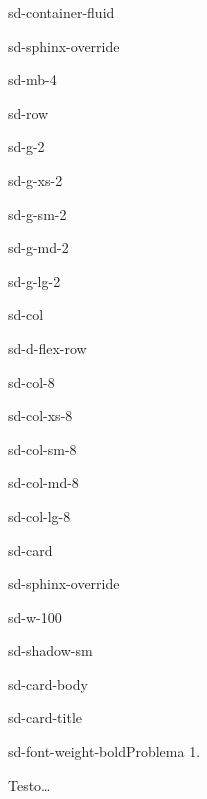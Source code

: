 \documentclass[letterpaper,10pt,italian]{jupyterBook}
\begin{document}
\begin{sphinxuseclass}{sd-container-fluid}
\begin{sphinxuseclass}{sd-sphinx-override}
\begin{sphinxuseclass}{sd-mb-4}
\begin{sphinxuseclass}{sd-row}
\begin{sphinxuseclass}{sd-g-2}
\begin{sphinxuseclass}{sd-g-xs-2}
\begin{sphinxuseclass}{sd-g-sm-2}
\begin{sphinxuseclass}{sd-g-md-2}
\begin{sphinxuseclass}{sd-g-lg-2}
\begin{sphinxuseclass}{sd-col}
\begin{sphinxuseclass}{sd-d-flex-row}
\begin{sphinxuseclass}{sd-col-8}
\begin{sphinxuseclass}{sd-col-xs-8}
\begin{sphinxuseclass}{sd-col-sm-8}
\begin{sphinxuseclass}{sd-col-md-8}
\begin{sphinxuseclass}{sd-col-lg-8}
\begin{sphinxuseclass}{sd-card}
\begin{sphinxuseclass}{sd-sphinx-override}
\begin{sphinxuseclass}{sd-w-100}
\begin{sphinxuseclass}{sd-shadow-sm}
\begin{sphinxuseclass}{sd-card-body}
\begin{sphinxuseclass}{sd-card-title}
\begin{sphinxuseclass}{sd-font-weight-bold}Problema 1.
\end{sphinxuseclass}
\end{sphinxuseclass}
\sphinxAtStartPar
Testo…


\end{sphinxuseclass}
\end{sphinxuseclass}
\end{sphinxuseclass}
\end{sphinxuseclass}
\end{sphinxuseclass}
\end{sphinxuseclass}
\end{sphinxuseclass}
\end{sphinxuseclass}
\end{sphinxuseclass}
\end{sphinxuseclass}
\end{sphinxuseclass}
\end{sphinxuseclass}
\end{sphinxuseclass}
\end{sphinxuseclass}
\end{sphinxuseclass}
\end{sphinxuseclass}
\end{sphinxuseclass}
\end{sphinxuseclass}
\end{sphinxuseclass}
\end{sphinxuseclass}
\end{sphinxuseclass}
\end{document}
